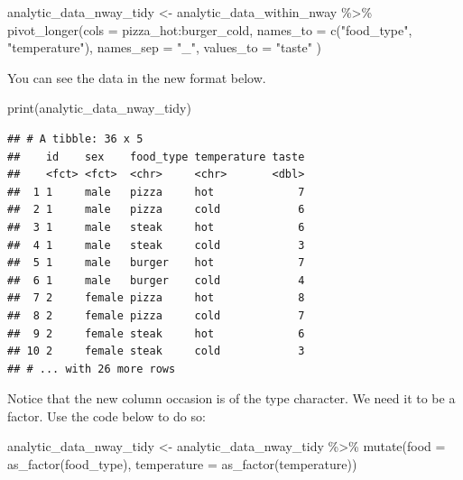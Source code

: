 \documentclass[
]{krantz}
\makeatletter
\newenvironment{Shaded}{\begin{snugshade}}{\end{snugshade}}
\newcommand{\AttributeTok}[1]{\textcolor[rgb]{0.61,0.61,0.61}{#1}}
\newcommand{\FunctionTok}[1]{\textcolor[rgb]{0,0,0}{#1}}
\newcommand{\NormalTok}[1]{#1}
\newcommand{\OtherTok}[1]{\textcolor[rgb]{0.37,0.37,0.37}{#1}}
\newcommand{\SpecialCharTok}[1]{\textcolor[rgb]{0,0,0}{#1}}
\newcommand{\StringTok}[1]{\textcolor[rgb]{0.5,0.5,0.5}{#1}}
\newenvironment{kframe}{%
\medskip{}
\setlength{\fboxsep}{.8em}
 \def\at@end@of@kframe{}%
 \ifinner\ifhmode%
  \def\at@end@of@kframe{\end{minipage}}%
  \begin{minipage}{\columnwidth}%
 \fi\fi%
 \def\FrameCommand##1{\hskip\@totalleftmargin \hskip-\fboxsep
 \colorbox{shadecolor}{##1}\hskip-\fboxsep
     \hskip-\linewidth \hskip-\@totalleftmargin \hskip\columnwidth}%
 \MakeFramed {\advance\hsize-\width
   \@totalleftmargin\z@ \linewidth\hsize
   \@setminipage}}%
 {\par\unskip\endMakeFramed%
 \at@end@of@kframe}
\renewenvironment{Shaded}{\begin{kframe}}{\end{kframe}}
\makeatother
\begin{document}
\begin{Shaded}
\begin{Highlighting}[]
\NormalTok{analytic\_data\_nway\_tidy }\OtherTok{\textless{}{-}}\NormalTok{ analytic\_data\_within\_nway }\SpecialCharTok{\%\textgreater{}\%}
  \FunctionTok{pivot\_longer}\NormalTok{(}\AttributeTok{cols =}\NormalTok{ pizza\_hot}\SpecialCharTok{:}\NormalTok{burger\_cold,}
               \AttributeTok{names\_to =} \FunctionTok{c}\NormalTok{(}\StringTok{"food\_type"}\NormalTok{, }\StringTok{"temperature"}\NormalTok{),}
               \AttributeTok{names\_sep =} \StringTok{"\_"}\NormalTok{,}
               \AttributeTok{values\_to =} \StringTok{"taste"}
\NormalTok{  )}
\end{Highlighting}
\end{Shaded}

You can see the data in the new format below.

\begin{Shaded}
\begin{Highlighting}[]
\FunctionTok{print}\NormalTok{(analytic\_data\_nway\_tidy)}
\end{Highlighting}
\end{Shaded}

\begin{verbatim}
## # A tibble: 36 x 5
##    id    sex    food_type temperature taste
##    <fct> <fct>  <chr>     <chr>       <dbl>
##  1 1     male   pizza     hot             7
##  2 1     male   pizza     cold            6
##  3 1     male   steak     hot             6
##  4 1     male   steak     cold            3
##  5 1     male   burger    hot             7
##  6 1     male   burger    cold            4
##  7 2     female pizza     hot             8
##  8 2     female pizza     cold            7
##  9 2     female steak     hot             6
## 10 2     female steak     cold            3
## # ... with 26 more rows
\end{verbatim}

Notice that the new column occasion is of the type character. We need it to be a factor. Use the code below to do so:

\begin{Shaded}
\begin{Highlighting}[]
\NormalTok{analytic\_data\_nway\_tidy }\OtherTok{\textless{}{-}}\NormalTok{ analytic\_data\_nway\_tidy }\SpecialCharTok{\%\textgreater{}\%}
  \FunctionTok{mutate}\NormalTok{(}\AttributeTok{food =} \FunctionTok{as\_factor}\NormalTok{(food\_type),}
         \AttributeTok{temperature =} \FunctionTok{as\_factor}\NormalTok{(temperature))}
\end{Highlighting}
\end{Shaded}
\end{document}

